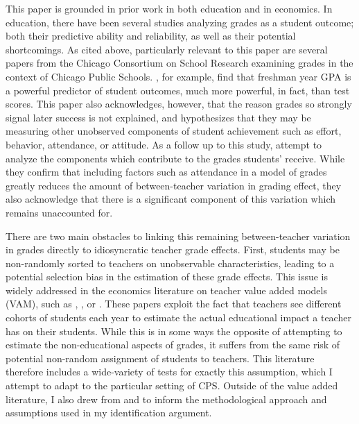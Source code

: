 \documentclass[../thesis_main.tex]{subfiles}
\begin{document}
\doublespacing

This paper is grounded in prior work in both education and in economics. In education, there have been several studies analyzing grades as a student outcome; both their predictive ability and reliability, as well as their potential shortcomings. As cited above, particularly relevant to this paper are several papers from the Chicago Consortium on School Research examining grades in the context of Chicago Public Schools. \citet{eastonPredictivePowerNinthGrade2017}, for example, find that freshman year GPA is a powerful predictor of student outcomes, much more powerful, in fact, than test scores. This paper also acknowledges, however, that the reason grades so strongly signal later success is not explained, and hypothesizes that they may be measuring other unobserved components of student achievement such as effort, behavior, attendance, or attitude. As a follow up to this study, \citet{allensworthWhyStudentsGet2018} attempt to analyze the components which contribute to the grades students' receive. While they confirm that including factors such as attendance in a model of grades greatly reduces the amount of between-teacher variation in grading effect, they also acknowledge that there is a significant component of this variation which remains unaccounted for. 

There are two main obstacles to linking this remaining between-teacher variation in grades directly to idiosyncratic teacher grade effects. First, students may be non-randomly sorted to teachers on unobservable characteristics, leading to a potential selection bias in the estimation of these grade effects. This issue is widely addressed in the economics literature on teacher value added models (VAM), such as \citet{chettyMeasuringImpactsTeachers2014}, \citet{kaneEstimatingTeacherImpacts2008}, or \citet{jacksonTeacherEffectsTeacherRelated2014}. These papers exploit the fact that teachers see different cohorts of students each year to estimate the actual educational impact a teacher has on their students. While this is in some ways the opposite of attempting to estimate the non-educational aspects of grades, it suffers from the same risk of potential non-random assignment of students to teachers. This literature therefore includes a wide-variety of tests for exactly this assumption, which I attempt to adapt to the particular setting of CPS. Outside of the value added literature, I also drew from \citet{abdulkadirogluChartersLotteriesTesting2016} and \citet{kolesarIdentificationInferenceMany2015} to inform the methodological approach and assumptions used in my identification argument. 
\end{document}
